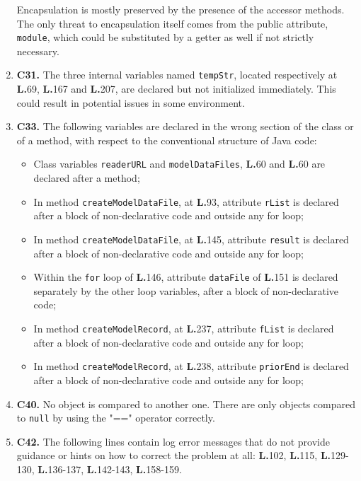 \begin{enumerate}
Encapsulation is mostly preserved by the presence of the accessor methods. The only threat to encapsulation itself comes from the public attribute, \texttt{module}, which could be substituted by a getter as well if not strictly necessary.
\item \textbf{C31.} The three internal variables named \texttt{tempStr}, located respectively at \textbf{L.}69, \textbf{L.}167 and \textbf{L.}207, are declared but not initialized immediately. This could result in potential issues in some environment.
\item \textbf{C33.} The following variables are declared in the wrong section of the class or of a method, with respect to the conventional structure of Java code:
	\begin{itemize}
	\item Class variables \texttt{readerURL} and \texttt{modelDataFiles}, \textbf{L.}60 and \textbf{L.}60 are declared after a method;
	\item In method \texttt{createModelDataFile}, at \textbf{L.}93, attribute \texttt{rList} is declared after a block of non-declarative code and outside any for loop;
	\item In method \texttt{createModelDataFile}, at \textbf{L.}145, attribute \texttt{result} is declared after a block of non-declarative code and outside any for loop;
	\item Within the \texttt{for} loop of \textbf{L.}146, attribute \texttt{dataFile} of \textbf{L.}151 is declared separately by the other loop variables, after a block of non-declarative code;
	\item In method \texttt{createModelRecord}, at \textbf{L.}237, attribute \texttt{fList} is declared after a block of non-declarative code and outside any for loop;
	\item In method \texttt{createModelRecord}, at \textbf{L.}238, attribute \texttt{priorEnd} is declared after a block of non-declarative code and outside any for loop;
	\end{itemize}
\item \textbf{C40.} No object is compared to another one. There are only objects compared to \texttt{null} by using the "==" operator correctly.
\item \textbf{C42.} The following lines contain log error messages that do not provide guidance or hints on how to correct the problem at all: \textbf{L.}102, \textbf{L.}115, \textbf{L.}129-130, \textbf{L.}136-137, \textbf{L.}142-143, \textbf{L.}158-159.
\end{enumerate}

